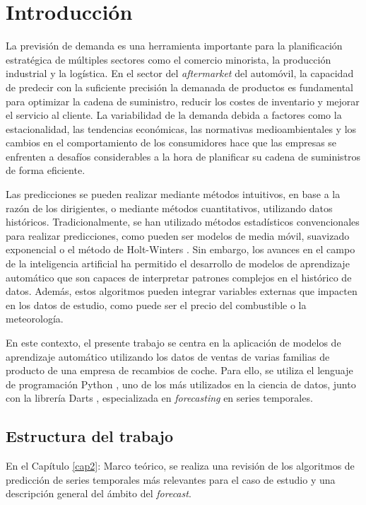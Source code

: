 \chapter{Introducción}\label{cap1}

La previsión de demanda es una herramienta importante para la planificación estratégica de múltiples sectores como el comercio minorista, la producción industrial y la logística. En el sector del \textit{aftermarket} del automóvil, la capacidad de predecir con la suficiente precisión la demanada de productos es fundamental para optimizar la cadena de suministro, reducir los costes de inventario y mejorar el servicio al cliente. La variabilidad de la demanda debida a factores como la estacionalidad, las tendencias económicas, las normativas medioambientales y los cambios en el comportamiento de los consumidores hace que las empresas se enfrenten a desafíos considerables a la hora de planificar su cadena de suministros de forma eficiente.

Las predicciones se pueden realizar mediante métodos intuitivos, en base a la razón de los dirigientes, o mediante métodos cuantitativos, utilizando datos históricos. Tradicionalmente, se han utilizado métodos estadísticos convencionales para realizar predicciones, como pueden ser modelos de media móvil, suavizado exponencial o el método de Holt-Winters \cite{winters}. Sin embargo, los avances en el campo de la inteligencia artificial ha permitido el desarrollo de modelos de aprendizaje automático que son capaces de interpretar patrones complejos en el histórico de datos. Además, estos algoritmos pueden integrar variables externas que impacten en los datos de estudio, como puede ser el precio del combustible o la meteorología.

En este contexto, el presente trabajo se centra en la aplicación de modelos de aprendizaje automático utilizando los datos de ventas de varias familias de producto de una empresa de recambios de coche. Para ello, se utiliza el lenguaje de programación Python \cite{python}, uno de los más utilizados en la ciencia de datos, junto con la librería Darts \cite{darts}, especializada en \textit{forecasting} en series temporales.

\section{Estructura del trabajo}

En el Capítulo \ref{cap2}: Marco teórico, se realiza una revisión de los algoritmos de predicción de series temporales más relevantes para el caso de estudio y una descripción general del ámbito del \textit{forecast}.


